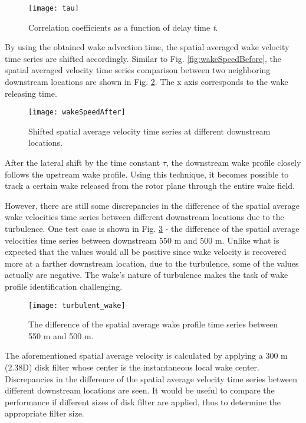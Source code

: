 \documentclass{umthesis}
\begin{document}
\begin{figure}
  \centering
  \texttt{[image: tau]}
  \caption{Correlation coefficients as a function of delay time \textit{t}.}\label{fig:tau}
\end{figure}

By using the obtained wake advection time, the spatial averaged wake velocity time series are shifted accordingly. Similar to Fig. \ref{fig:wakeSpeedBefore}, the spatial averaged velocity time series comparison between two neighboring downstream locations are shown in Fig. \ref{fig:wakeSpeedAfter}. The x axis corresponds to the wake releasing time.

\begin{figure}
  \centering
  \texttt{[image: wakeSpeedAfter]}
  \caption{Shifted spatial average velocity time series at different downstream locations.}\label{fig:wakeSpeedAfter}
\end{figure}

After the lateral shift by the time constant $\tau$, the downstream wake profile closely follows the upstream wake profile. Using this technique, it becomes possible to track a certain wake released from the rotor plane through the entire wake field. 

However, there are still some discrepancies in the difference of the spatial average wake velocities time series between different downstream locations due to the turbulence. One test case is shown in Fig. \ref{fig:turbulent_wake} - the difference of the spatial average velocities time series between downstream 550 m and 500 m. Unlike what is expected that the values would all be positive since wake velocity is recovered more at a farther downstream location, due to the turbulence, some of the values actually are negative. The wake's nature of turbulence makes the task of wake profile identification challenging.

\begin{figure}
  \centering
  \texttt{[image: turbulent\_wake]}
  \caption{The difference of the spatial average wake profile time series between 550 m and 500 m.}\label{fig:turbulent_wake}
\end{figure}

The aforementioned spatial average velocity is calculated by applying a 300 m (2.38D) disk filter whose center is the instantaneous local wake center. Discrepancies in the difference of the spatial average velocity time series between different downstream locations are seen. It would be useful to compare the performance if different sizes of disk filter are applied, thus to determine the appropriate filter size. 
\end{document}
